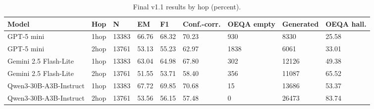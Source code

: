 \begin{table}[t]
\centering
\small
\begin{tabular}{lllllllll}
\toprule
Model & Hop & N & EM & F1 & Conf.-corr. & OEQA empty & Generated & OEQA hall. \\
\midrule
GPT-5 mini & 1hop & 13383 & 66.76 & 68.32 & 70.23 & 930 & 8330 & 25.58 \\
GPT-5 mini & 2hop & 13761 & 53.13 & 55.23 & 62.97 & 1838 & 6061 & 33.01 \\
Gemini 2.5 Flash-Lite & 1hop & 13383 & 63.04 & 64.98 & 67.80 & 302 & 12126 & 49.38 \\
Gemini 2.5 Flash-Lite & 2hop & 13761 & 51.55 & 53.71 & 58.40 & 356 & 11087 & 65.52 \\
Qwen3-30B-A3B-Instruct & 1hop & 13383 & 67.72 & 69.85 & 70.68 & 15 & 13686 & 53.37 \\
Qwen3-30B-A3B-Instruct & 2hop & 13761 & 53.56 & 56.15 & 57.48 & 0 & 26473 & 83.74 \\
\bottomrule
\end{tabular}
\caption{Final v1.1 results by hop (percent).}
\label{tab:core-v11-hop}
\end{table}
